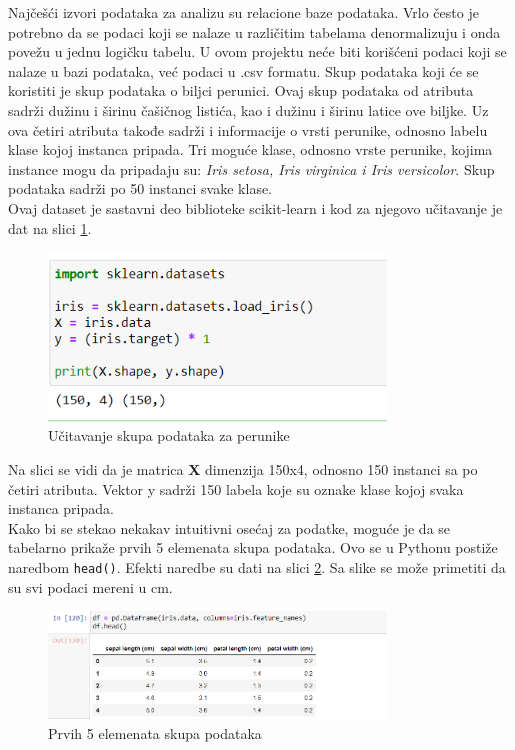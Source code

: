 \documentclass[a4paper,12pt]{report}
\begin{document}
Najčešći izvori podataka za analizu su relacione baze podataka. Vrlo često je potrebno da se podaci koji se nalaze u različitim tabelama denormalizuju i onda povežu u jednu logičku tabelu. U ovom projektu neće biti korišćeni podaci koji se nalaze u bazi podataka, već podaci u .csv formatu. Skup podataka koji će se koristiti je skup podataka o biljci perunici. Ovaj skup podataka od atributa sadrži dužinu i širinu čašičnog listića, kao i dužinu i širinu latice ove biljke. Uz ova četiri atributa takođe sadrži i informacije o vrsti perunike, odnosno labelu klase kojoj instanca pripada. Tri moguće klase, odnosno vrste perunike, kojima instance mogu da pripadaju su: \textit{Iris setosa, Iris virginica i Iris versicolor}. Skup podataka sadrži po 50 instanci svake klase. \\

Ovaj dataset je sastavni deo biblioteke scikit-learn i kod za njegovo učitavanje je dat na slici \ref{fig:irisload}.
\begin{figure}[h]
    \centering
    \includegraphics[width=0.8\textwidth]{iris_load.png}
    \caption{Učitavanje skupa podataka za perunike}\label{fig:irisload}
\end{figure}
 Na slici se vidi da je matrica \textbf{X} dimenzija 150x4, odnosno 150 instanci sa po četiri atributa. Vektor y sadrži 150 labela koje su oznake klase kojoj svaka instanca pripada.\\ 
 
Kako bi se stekao nekakav intuitivni osećaj za podatke, moguće je da se tabelarno prikaže prvih 5 elemenata skupa podataka. Ovo se u Pythonu postiže naredbom \texttt{head()}. Efekti naredbe su dati na slici \ref{fig:irishead}. Sa slike se može primetiti da su svi podaci mereni u cm.   
\begin{figure}[h]
    \centering
    \includegraphics[width=0.8\textwidth]{iris_head.png}
    \caption{Prvih 5 elemenata skupa podataka}\label{fig:irishead}
\end{figure}
\end{document}
